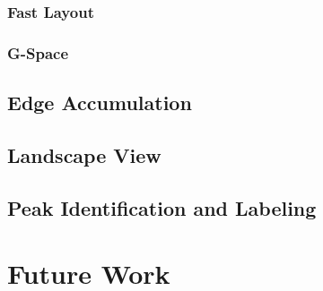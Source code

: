 \documentclass[pdf,12pt,report,strict]{SANDreport}
\begin{document}
\subsection{Fast Layout}
\label{sec:Layout:FastLayout}

\subsection{G-Space}
\label{sec:Layout:GSpace}

\section{Edge Accumulation}
\label{sec:EdgeAccumulation}

\section{Landscape View}
\label{sec:LandscapeView}

\section{Peak Identification and Labeling}
\label{sec:PeakIdentificationAndLabeling}


\chapter{Future Work}
\label{chap:FutureWork}





\end{document}
